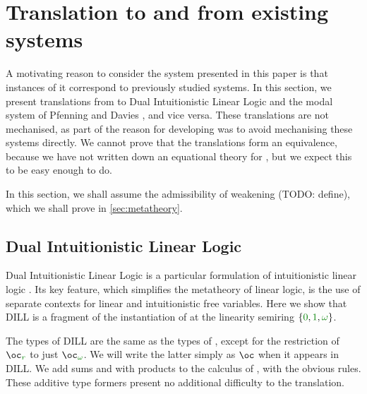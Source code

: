 \documentclass[submission,copyright,creativecommons]{eptcs}
\begin{document}
\section{Translation to and from existing systems}
\label{sec:translation}

A motivating reason to consider the system presented in this paper is that
instances of it correspond to previously studied systems.
In this section, we present translations from \name{} to Dual Intuitionistic
Linear Logic \cite{Barber1996} and the modal system of Pfenning and Davies
\cite{judgmental}, and vice versa.
These translations are not mechanised, as part of the reason for developing
\name{} was to avoid mechanising these systems directly.
We cannot prove that the translations form an equivalence, because we have not
written down an equational theory for \name{}, but we expect this to be easy
enough to do.

In this section, we shall assume the admissibility of weakening (TODO: define),
which we shall prove in \autoref{sec:metatheory}.

\subsection{Dual Intuitionistic Linear Logic}\label{sec:dill}
Dual Intuitionistic Linear Logic is a particular formulation of intuitionistic
linear logic \cite{Barber1996}.
Its key feature, which simplifies the metatheory of linear logic, is the use of
separate contexts for linear and intuitionistic free variables.
Here we show that DILL is a fragment of the instantiation of \name{} at the
linearity semiring $\{\zero, \linear, \unrestricted\}$.

The types of DILL are the same as the types of \name, except for the
restriction of $\excl{r}{}$ to just $\excl{\unrestricted}{}$.
We will write the latter simply as $\oc$ when it appears in DILL.
We add sums and with products to the calculus of \cite{Barber1996}, with the
obvious rules.
These additive type formers present no additional difficulty to the translation.
\end{document}
